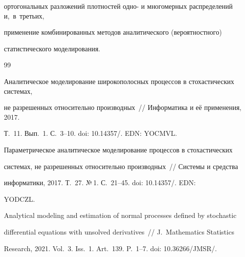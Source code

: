 ортогональных разложений плотностей одно- и многомерных распределений и,~в~третьих, 

применение комбинированных методов аналитического (вероятностного)  

статистического моделирования.



\vspace*{-4pt}



{\small\frenchspacing

{%


\begin{thebibliography}{99}



\vspace*{-2pt}




Аналитическое моделирование широкополосных процессов в стохастических сис\-те\-мах, 

не разрешенных относительно производных~/\!\!/ Информатика и её применения, 2017. 

Т.~11. Вып.~1. С.~3--10. doi: 10.14357\!/. EDN: YOCMVL.






Параметрическое аналитическое моделирование процессов в стохастических  

системах, не разрешенных относительно производных~/\!\!/ Системы и средства 

информатики, 2017. Т.~27. №\,1. С.~21--45. doi: 10.14357\!/. EDN: 

YODCZL.






Analytical modeling and estimation of normal processes defined by stochastic 

differential equations with unsolved derivatives~/\!\!/ J.~Mathematics Statistics 

Research, 2021. Vol.~3. Iss.~1. Art.~139. P.~1--7. doi: 10.36266\!/\!JMSR\!/.




\end{thebibliography}}}
